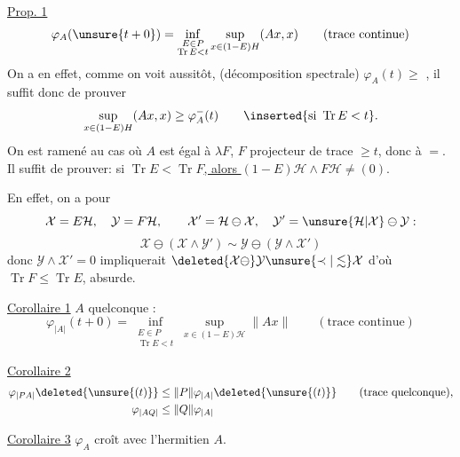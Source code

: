 \uline{Prop. 1}
\[
\varphi_A(\unsure{t+0})=
\inf_{\substack{E\in P\\\operatorname{Tr}E<t}}
\sup_{x\in(1-E)H}(Ax,x)
\qquad(\text{trace continue})
\]
On a en effet, comme on voit aussitôt, (décomposition spectrale)
$\varphi_A(t)\geq$ , il suffit donc de prouver
\[
\sup_{x\in(1-E)H}(Ax,x)\geq\varphi_A^-(t)
\qquad\inserted{\text{si }\operatorname{Tr}E<t}.
\]
On est ramené au cas où $A$ est égal à $\lambda F$, $F$ projecteur de trace $\geq t$, donc à  $=$.
Il suffit de prouver: si \uline{$\operatorname{Tr}E<\operatorname{Tr}F$, alors $(1-E)\mathcal H\wedge F\mathcal H\ne(0)$}.

En effet, on a  pour
\[
\mathcal X=E\mathcal H,\quad\mathcal Y=F\mathcal H,\qquad
\mathcal X'=\mathcal H\ominus\mathcal X,\quad
\mathcal Y'=\unsure{\mathcal H|\mathcal X}\ominus\mathcal Y:
\]
\[
\mathcal X\ominus(\mathcal X\wedge\mathcal Y')\sim
\mathcal Y\ominus(\mathcal Y\wedge\mathcal X')
\]
donc $\mathcal Y\wedge\mathcal X'=0$ impliquerait
$\deleted{\mathcal X\ominus}\mathcal Y\unsure{\prec|\lesssim}\mathcal X$
d'où $\operatorname{Tr}F\leq\operatorname{Tr}E$, absurde.

\uline{Corollaire 1} $A$ quelconque :
\[
\varphi_{|A|}(t+0)=\inf_{\substack{E\in P\\\operatorname{Tr}E<t}}
\sup_{x\in(1-E)\mathcal H}\|Ax\|
\qquad(\text{trace continue})
\]

\uline{Corollaire 2}
\[
\begin{aligned}
\varphi_{|PA|}\deleted{\unsure{(t)}}&\leq\|P\|\varphi_{|A|}\deleted{\unsure{(t)}}
\qquad(\text{trace quelconque}),\\
\varphi_{|AQ|}&\leq\|Q\|\varphi_{|A|}
\end{aligned}
\]

\uline{Corollaire 3} $\varphi_A$ croît avec l'hermitien  $A$.

